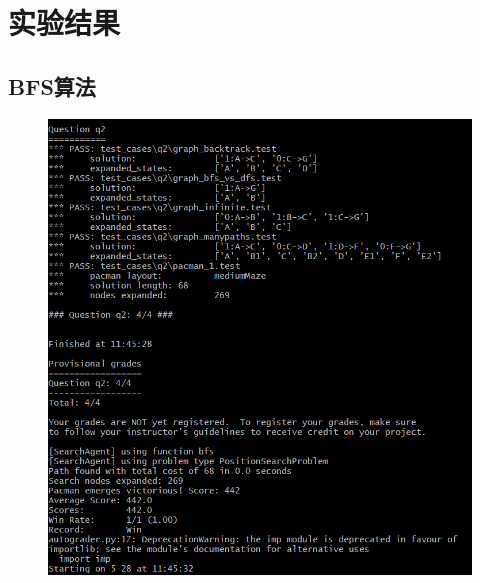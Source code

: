 \documentclass{ctexart}
\begin{document}
\section{实验结果}
\subsection{\hei BFS算法}
\begin{figure}[H]	
	\centering	
	\includegraphics[scale=0.6]{bfs.png}
		
\end{figure}
\end{document}
